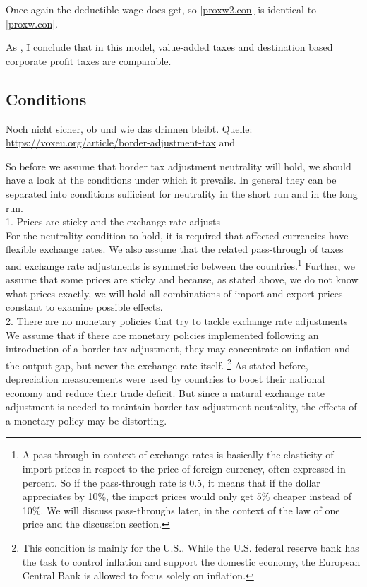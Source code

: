 Once again the deductible wage does get, so \eqref{proxw2.con} is identical to \eqref{proxw.con}. 

As \cite{buiter2017exchange}, I conclude that in this model, value-added taxes and destination based corporate profit taxes are comparable. 





\subsection{Conditions}

Noch nicht sicher, ob und wie das drinnen bleibt. 
Quelle: \url{https://voxeu.org/article/border-adjustment-tax} and \cite{barbiero2018macroeconomics}

So before we assume that border tax adjustment neutrality will hold, we should have a look at the conditions under which it prevails. In general they can be separated into conditions sufficient for neutrality in the short run and in the long run. \\
1. Prices are sticky and the exchange rate adjusts \\
For the neutrality condition to hold, it is required that affected currencies have flexible exchange rates. We also assume that the related pass-through of taxes and exchange rate adjustments is symmetric between the countries.\footnote{A pass-through in context of exchange rates is basically the elasticity of import prices in respect to the price of foreign currency, often expressed in percent. So if the pass-through rate is 0.5, it means that if the dollar appreciates by 10\%, the import prices would only get 5\% cheaper instead of 10\%. We will discuss pass-throughs later, in the context of the law of one price and the discussion section.} Further, we assume that some prices are sticky and because, as stated above, we do not know what prices exactly, we will hold all combinations of import and export prices constant to examine possible effects. \\
2. There are no monetary policies that try to tackle exchange rate adjustments \\
We assume that if there are monetary policies implemented following an introduction of a border tax adjustment, they may concentrate on inflation and the output gap, but never the exchange rate itself. \footnote{This condition is mainly for the U.S.. While the U.S. federal reserve bank has the task to control inflation and support the domestic economy, the European Central Bank is allowed to focus solely on inflation.} As stated before, depreciation measurements were used by countries to boost their national economy and reduce their trade deficit. But since a natural exchange rate adjustment is needed to maintain border tax adjustment neutrality, the effects of a monetary policy may be distorting.
